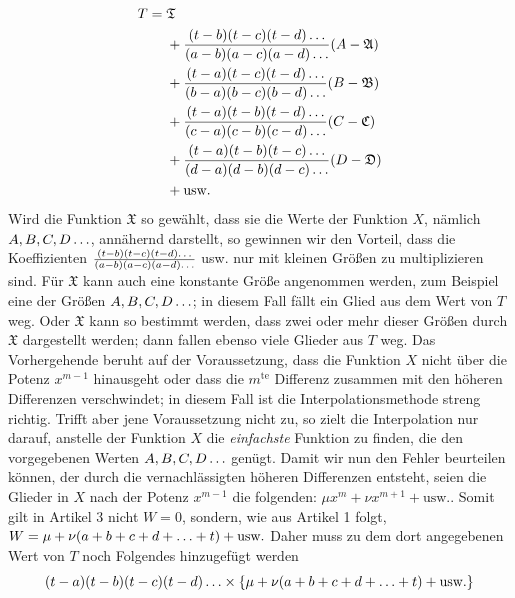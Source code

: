 \[
\begin{aligned}
T={}&\mathfrak{T}\\
&{}+\frac{(t-b)(t-c)(t-d)\mathinner{.\,.\,.}}{(a-b)(a-c)(a-d)\mathinner{.\,.\,.}}(A-\mathfrak{A})\\
&{}+\frac{(t-a)(t-c)(t-d)\mathinner{.\,.\,.}}{(b-a)(b-c)(b-d)\mathinner{.\,.\,.}}(B-\mathfrak{B})\\
&{}+\frac{(t-a)(t-b)(t-d)\mathinner{.\,.\,.}}{(c-a)(c-b)(c-d)\mathinner{.\,.\,.}}(C-\mathfrak{C})\\
&{}+\frac{(t-a)(t-b)(t-c)\mathinner{.\,.\,.}}{(d-a)(d-b)(d-c)\mathinner{.\,.\,.}}(D-\mathfrak{D})\\
&{}+\text{usw.}
\end{aligned}
\]
Wird die Funktion $\mathfrak{X}$ so gewählt, dass sie die Werte der Funktion $X$, nämlich $A,B,C,D\mathinner{.\,.\,.}$,
annähernd darstellt, so gewinnen wir den Vorteil, dass die Koeffizienten
$\frac{(t-b)(t-c)(t-d)\mathinner{.\,.\,.}}{(a-b)(a-c)(a-d)\mathinner{.\,.\,.}}$ usw.
nur mit kleinen Größen zu multiplizieren sind. Für $\mathfrak{X}$ kann auch eine konstante Größe
angenommen werden, zum Beispiel eine der Größen $A,B,C,D\mathinner{.\,.\,.}$; in diesem Fall fällt ein Glied aus dem Wert von
$T$ weg. Oder $\mathfrak{X}$ kann so bestimmt werden, dass zwei oder mehr dieser Größen
durch $\mathfrak{X}$ dargestellt werden; dann fallen ebenso viele Glieder aus $T$ weg.
Das Vorhergehende beruht auf der Voraussetzung, dass die Funktion $X$ nicht über die Potenz
$x^{m-1}$ hinausgeht oder dass die $m^{\mathrm{te}}$ Differenz zusammen mit den höheren Differenzen verschwindet; in
diesem Fall ist die Interpolationsmethode streng richtig. Trifft aber jene Voraussetzung
nicht zu, so zielt die Interpolation nur darauf, anstelle der Funktion $X$ die \textit{einfachste} Funktion zu finden, die den vorgegebenen Werten $A,B,C,D\mathinner{.\,.\,.}$ genügt. Damit wir nun
den Fehler beurteilen können, der durch die vernachlässigten höheren Differenzen entsteht,
seien die Glieder in \(X\) nach der Potenz \(x^{m-1}\) die folgenden: \(\mu x^m+\nu x^{m+1}+\text{usw.}\). Somit gilt in Artikel 3
nicht \(W=0\), sondern, wie aus Artikel 1 folgt, \(W=\mu+\nu(a+b+c+d+\mathinner{.\,.\,.}+t)+\text{usw.}\)
Daher muss zu dem dort angegebenen Wert von \(T\) noch Folgendes hinzugefügt werden
\[
(t-a)(t-b)(t-c)(t-d)\mathinner{.\,.\,.}\times\{\mu+\nu(a+b+c+d+\mathinner{.\,.\,.}+t)+\text{usw.}\}
\]

\endgroup
